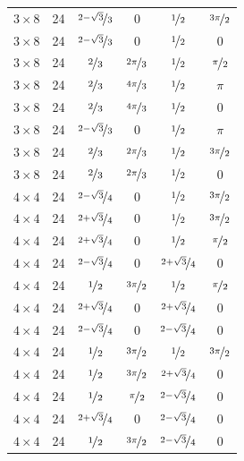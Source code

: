 \documentclass{article}
\begin{document}
\begin{longtable}{cccccc}
$3 \times 8$ & 24 & $\nicefrac{2-\sqrt{3}}{3}$ & 0 & $\nicefrac{1}{2}$ & $\nicefrac{3\pi}{2}$ \\
$3 \times 8$ & 24 & $\nicefrac{2-\sqrt{3}}{3}$ & 0 & $\nicefrac{1}{2}$ & 0 \\
$3 \times 8$ & 24 & $\nicefrac{2}{3}$ & $\nicefrac{2\pi}{3}$ & $\nicefrac{1}{2}$ & $\nicefrac{\pi}{2}$ \\
$3 \times 8$ & 24 & $\nicefrac{2}{3}$ & $\nicefrac{4\pi}{3}$ & $\nicefrac{1}{2}$ & $\pi$ \\
$3 \times 8$ & 24 & $\nicefrac{2}{3}$ & $\nicefrac{4\pi}{3}$ & $\nicefrac{1}{2}$ & 0 \\
$3 \times 8$ & 24 & $\nicefrac{2-\sqrt{3}}{3}$ & 0 & $\nicefrac{1}{2}$ & $\pi$ \\
$3 \times 8$ & 24 & $\nicefrac{2}{3}$ & $\nicefrac{2\pi}{3}$ & $\nicefrac{1}{2}$ & $\nicefrac{3\pi}{2}$ \\
$3 \times 8$ & 24 & $\nicefrac{2}{3}$ & $\nicefrac{2\pi}{3}$ & $\nicefrac{1}{2}$ & 0 \\
$4 \times 4$ & 24 & $\nicefrac{2-\sqrt{3}}{4}$ & 0 & $\nicefrac{1}{2}$ & $\nicefrac{3\pi}{2}$ \\
$4 \times 4$ & 24 & $\nicefrac{2+\sqrt{3}}{4}$ & 0 & $\nicefrac{1}{2}$ & $\nicefrac{3\pi}{2}$ \\
$4 \times 4$ & 24 & $\nicefrac{2+\sqrt{3}}{4}$ & 0 & $\nicefrac{1}{2}$ & $\nicefrac{\pi}{2}$ \\
$4 \times 4$ & 24 & $\nicefrac{2-\sqrt{3}}{4}$ & 0 & $\nicefrac{2+\sqrt{3}}{4}$ & 0 \\
$4 \times 4$ & 24 & $\nicefrac{1}{2}$ & $\nicefrac{3\pi}{2}$ & $\nicefrac{1}{2}$ & $\nicefrac{\pi}{2}$ \\
$4 \times 4$ & 24 & $\nicefrac{2+\sqrt{3}}{4}$ & 0 & $\nicefrac{2+\sqrt{3}}{4}$ & 0 \\
$4 \times 4$ & 24 & $\nicefrac{2-\sqrt{3}}{4}$ & 0 & $\nicefrac{2-\sqrt{3}}{4}$ & 0 \\
$4 \times 4$ & 24 & $\nicefrac{1}{2}$ & $\nicefrac{3\pi}{2}$ & $\nicefrac{1}{2}$ & $\nicefrac{3\pi}{2}$ \\
$4 \times 4$ & 24 & $\nicefrac{1}{2}$ & $\nicefrac{3\pi}{2}$ & $\nicefrac{2+\sqrt{3}}{4}$ & 0 \\
$4 \times 4$ & 24 & $\nicefrac{1}{2}$ & $\nicefrac{\pi}{2}$ & $\nicefrac{2-\sqrt{3}}{4}$ & 0 \\
$4 \times 4$ & 24 & $\nicefrac{2+\sqrt{3}}{4}$ & 0 & $\nicefrac{2-\sqrt{3}}{4}$ & 0 \\
$4 \times 4$ & 24 & $\nicefrac{1}{2}$ & $\nicefrac{3\pi}{2}$ & $\nicefrac{2-\sqrt{3}}{4}$ & 0 \\

\end{longtable}
\end{document}
